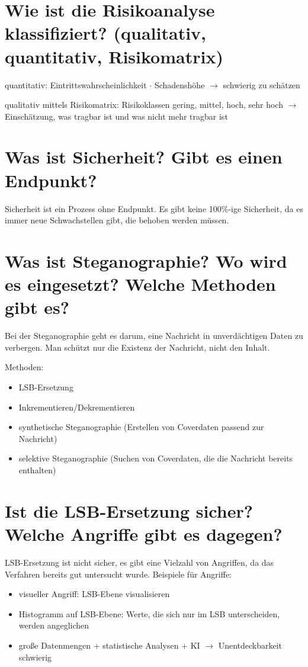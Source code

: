 \documentclass{article}
\begin{document}
	\section*{Wie ist die Risikoanalyse klassifiziert? (qualitativ, quantitativ, Risikomatrix)}
	quantitativ: Eintrittswahrscheinlichkeit $\cdot$ Schadenshöhe $\to$ schwierig zu schätzen
	
	qualitativ mittels Risikomatrix: Risikoklassen gering, mittel, hoch, sehr hoch $\to$ Einschätzung, was tragbar ist und was nicht mehr tragbar ist
	
	\section*{Was ist Sicherheit? Gibt es einen Endpunkt?}
	Sicherheit ist ein Prozess ohne Endpunkt. Es gibt keine 100\%-ige Sicherheit, da es immer neue Schwachstellen gibt, die behoben werden müssen.
	
	\section*{Was ist Steganographie? Wo wird es eingesetzt? Welche Methoden gibt es?}
	Bei der Steganographie geht es darum, eine Nachricht in unverdächtigen Daten zu verbergen. Man schützt nur die Existenz der Nachricht, nicht den Inhalt.
	
	Methoden:
	\begin{itemize}
		\item LSB-Ersetzung
		\item Inkrementieren/Dekrementieren
		\item synthetische Steganographie (Erstellen von Coverdaten passend zur Nachricht)
		\item selektive Steganographie (Suchen von Coverdaten, die die Nachricht bereits enthalten)
	\end{itemize}
	
	\section*{Ist die LSB-Ersetzung sicher? Welche Angriffe gibt es dagegen?}
	LSB-Ersetzung ist nicht sicher, es gibt eine Vielzahl von Angriffen, da das Verfahren bereits gut untersucht wurde. Beispiele für Angriffe:
	\begin{itemize}
		\item visueller Angriff: LSB-Ebene visualisieren
		\item Histogramm auf LSB-Ebene: Werte, die sich nur im LSB unterscheiden, werden angeglichen
		\item große Datenmengen + statistische Analysen + KI $\to$ Unentdeckbarkeit schwierig
	\end{itemize}
\end{document}
